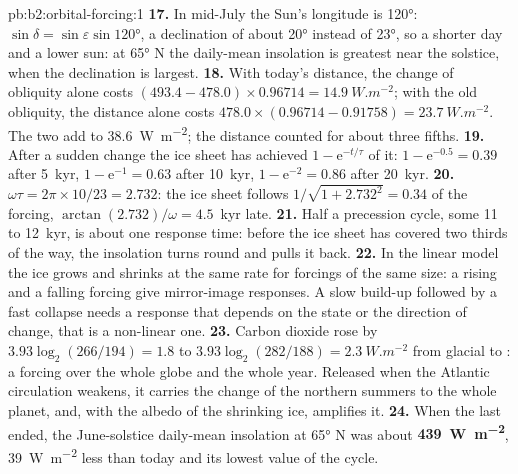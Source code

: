 \begin{solution}{pb:b2:orbital-forcing:1}
\textbf{17.} In mid-July the Sun's longitude is \ang{120}: $\sin\delta = \sin\varepsilon\sin\ang{120}$,
a declination of about \ang{20} instead of \ang{23}, so a shorter day and a lower sun: at
\ang{65} N the daily-mean insolation is greatest near the solstice, when the declination is largest.
\textbf{18.} With today's distance, the change of obliquity alone costs $(493.4 - 478.0) \times
0.96714 = \qty{14.9}{W.m^{-2}}$; with the old obliquity, the distance alone costs $478.0 \times
(0.96714 - 0.91758) = \qty{23.7}{W.m^{-2}}$. The two add to \qty{38.6}{W.m^{-2}}; the distance
counted for about three fifths.
\textbf{19.} After a sudden change the ice sheet has achieved $1 - \mathrm e^{-t/\tau}$ of it:
$1 - \mathrm e^{-0.5} = 0.39$ after \qty{5}{kyr}, $1 - \mathrm e^{-1} = 0.63$ after \qty{10}{kyr},
$1 - \mathrm e^{-2} = 0.86$ after \qty{20}{kyr}.
\textbf{20.} $\omega\tau = 2\pi \times 10/23 = 2.732$: the ice sheet follows $1/\sqrt{1 + 2.732^2} =
0.34$ of the forcing, $\arctan(2.732)/\omega = 4.5$~kyr late.
\textbf{21.} Half a precession cycle, some 11 to \qty{12}{kyr}, is about one response time: before
the ice sheet has covered two thirds of the way, the insolation turns round and pulls it back.
\textbf{22.} In the linear model the ice grows and shrinks at the same rate for forcings of the same
size: a rising and a falling forcing give mirror-image responses. A slow build-up followed by a fast
collapse needs a response that depends on the state or the direction of change, that is a
non-linear one.
\textbf{23.} Carbon dioxide rose by $3.93\log_2(266/194) = 1.8$ to $3.93\log_2(282/188) =
\qty{2.3}{W.m^{-2}}$ from glacial to : a forcing over the whole globe and the whole
year. Released when the Atlantic circulation weakens, it carries the change of the northern
summers to the whole planet, and, with the albedo of the shrinking ice, amplifies it.
\textbf{24.} When the last  ended, the June-solstice daily-mean insolation at
\ang{65} N was about \textbf{\qty{439}{W.m^{-2}}}, \qty{39}{W.m^{-2}} less than today and its lowest
value of the cycle.
\end{solution}
